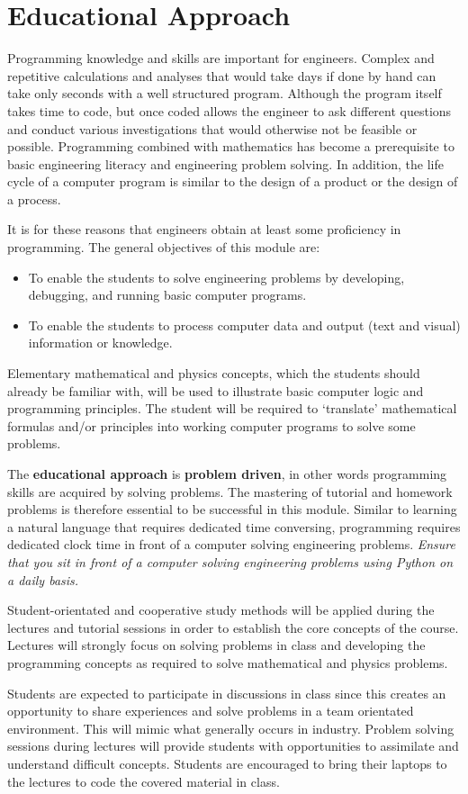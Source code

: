 \section{Educational Approach}
Programming knowledge and skills are important for engineers. Complex
and repetitive calculations and analyses that would take days if done
by hand can take only seconds with a well structured program. Although
the program itself takes time to code, but once coded allows the
engineer to ask different questions and conduct various investigations
that would otherwise not be feasible or possible. Programming combined
with mathematics has become a prerequisite to basic engineering
literacy and engineering problem solving. In addition, the life cycle
of a computer program is similar to the design of a product or the
design of a process.

It is for these reasons that engineers obtain at least some
proficiency in programming. The general objectives of this module are:
    \begin{itemize}
        \item To enable the students to solve engineering problems by
            developing, debugging, and running basic computer programs.
        \item To enable the students to process computer data and output
            (text and visual) information or knowledge.
    \end{itemize}

    Elementary mathematical and physics concepts, which the students
    should already be familiar with, will be used to illustrate basic
    computer logic and programming principles. The student will be
    required to `translate' mathematical formulas and/or principles
    into working computer programs to solve some problems.

    The \textbf{educational approach} is \textbf{problem driven}, in
    other words programming skills are acquired by solving
    problems. The mastering of tutorial and homework problems is
    therefore essential to be successful in this module. Similar to
    learning a natural language that requires dedicated time
    conversing, programming requires dedicated clock time in front of
    a computer solving engineering problems. \textit{Ensure that you sit in
    front of a computer solving engineering problems using Python on a
    daily basis.}

  Student-orientated and cooperative study methods will be applied
  during the lectures and tutorial sessions in order to establish the
  core concepts of the course. Lectures will strongly focus on solving
  problems in class and developing the programming concepts as
  required to solve mathematical and physics problems.

  Students are expected to participate in discussions in class since
  this creates an opportunity to share experiences and solve problems
  in a team orientated environment. This will mimic what generally
  occurs in industry. Problem solving sessions during lectures will
  provide students with opportunities to assimilate and understand
  difficult concepts. Students are encouraged to bring their laptops
  to the lectures to code the covered material in class.
